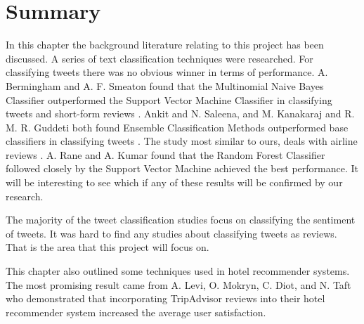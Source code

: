 
\section{Summary}


In this chapter the background literature relating to this project has been discussed. A series of text classification techniques were researched. For classifying tweets there was no obvious winner in terms of performance. A. Bermingham and A. F. Smeaton found that the Multinomial Naive Bayes Classifier outperformed the Support Vector Machine Classifier in classifying tweets and short-form reviews \cite{Berm2010}. Ankit and N. Saleena, and M. Kanakaraj and R. M. R. Guddeti both found Ensemble Classification Methods outperformed base classifiers in classifying tweets \cite{Ankit2018,Kanakaraj2015}. The study most similar to ours, deals with airline reviews \cite{Rane2018}. A. Rane and A. Kumar found that the Random Forest Classifier followed closely by the Support Vector Machine achieved the best performance. It will be interesting to see which if any of these results will be confirmed by our research.

The majority of the tweet classification studies focus on classifying the sentiment of tweets. It was hard to find any studies about classifying tweets as reviews. That is the area that this project will focus on. 

This chapter also outlined some techniques used in hotel recommender systems. The most promising result came from A. Levi, O. Mokryn, C. Diot, and N. Taft who demonstrated that incorporating TripAdvisor reviews into their hotel recommender system increased the average user satisfaction.






